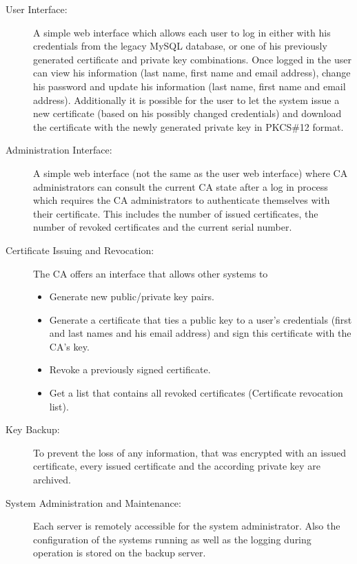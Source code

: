 \documentclass[a4paper, toc=index, 12pt, DIV14, twoside, BCOR2cm, headsepline, numbers=noenddot, bibliography=totoc]{scrbook}
\begin{document}
\begin{description}

\item[User Interface: ]
A simple web interface which allows each user to log in either with his credentials from the legacy MySQL database, or one of his previously generated certificate and private key combinations.
Once logged in the user can view his information (last name, first name and email address), change his password and update his information (last name, first name and email address).
Additionally it is possible for the user to let the system issue a new certificate (based on his possibly changed credentials) and download the certificate with the newly generated private key in PKCS\#12 format.

\item[Administration Interface: ]
A simple web interface (not the same as the user web interface) where CA administrators can consult the current CA state after a log in process which requires the CA administrators to authenticate themselves with their certificate. This includes the number of issued certificates, the number of revoked certificates and the current serial number.

\item[Certificate Issuing and Revocation: ]
The CA offers an interface that allows other systems to
\begin{itemize}
\item Generate new public/private key pairs.
\item Generate a certificate that ties a public key to a user's credentials (first and last names and his email address) and sign this certificate with the CA's key.
\item Revoke a previously signed certificate.
\item Get a list that contains all revoked certificates (Certificate revocation list).
\end{itemize}

\item[Key Backup: ]
To prevent the loss of any information, that was encrypted with an issued certificate, every issued certificate and the according private key are archived.

\item[System Administration and Maintenance: ]
Each server is remotely accessible for the system administrator. Also the configuration of the systems running as well as the logging during operation is stored on the backup server.

\end{description}
\end{document}
